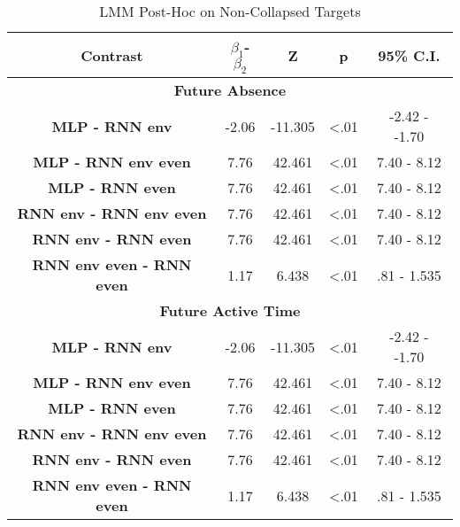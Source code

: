 \begin{table}[h]
\centering
\caption{LMM Post-Hoc on Non-Collapsed Targets}
\label{exploded_post_hoc_33}
\begin{tabular}{ccccc}
\hline
\textbf{Contrast}  & \textbf{$\beta_1$-$\beta_2$} & \textbf{Z} & \textbf{p} & \textbf{95\% C.I.}                  \\ \hline
\multicolumn{5}{c}{\textbf{Future Absence}}                                                                         \\ \hline
\textbf{MLP - RNN env} & -2.06                & -11.305     & \textless .01   & -2.42 - -1.70                     \\
\textbf{MLP - RNN env even}           & 7.76                & 42.461     & \textless .01   & 7.40 - 8.12                     \\
\textbf{MLP - RNN even}           & 7.76                & 42.461     & \textless .01   & 7.40 - 8.12                     \\
\textbf{RNN env - RNN env even}           & 7.76                & 42.461     & \textless .01   & 7.40 - 8.12                     \\
\textbf{RNN env - RNN even}           & 7.76                & 42.461     & \textless .01   & 7.40 - 8.12                     \\
\textbf{RNN env even - RNN even}          & 1.17                & 6.438     & \textless .01   & .81 - 1.535                    \\ \hline

\multicolumn{5}{c}{\textbf{Future Active Time}}                                                                     \\ \hline
\textbf{MLP - RNN env} & -2.06                & -11.305     & \textless .01   & -2.42 - -1.70                     \\
\textbf{MLP - RNN env even}           & 7.76                & 42.461     & \textless .01   & 7.40 - 8.12                     \\
\textbf{MLP - RNN even}           & 7.76                & 42.461     & \textless .01   & 7.40 - 8.12                     \\
\textbf{RNN env - RNN env even}           & 7.76                & 42.461     & \textless .01   & 7.40 - 8.12                     \\
\textbf{RNN env - RNN even}           & 7.76                & 42.461     & \textless .01   & 7.40 - 8.12                     \\
\textbf{RNN env even - RNN even}          & 1.17                & 6.438     & \textless .01   & .81 - 1.535                    \\ \hline


\end{tabular}
\end{table}
